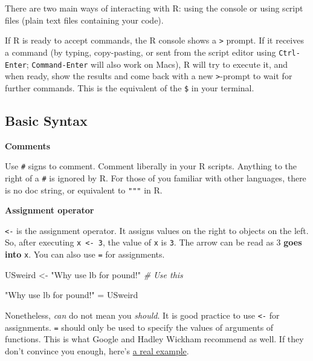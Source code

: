 \documentclass[
]{book}
\newenvironment{Shaded}{\begin{snugshade}}{\end{snugshade}}
\newcommand{\CommentTok}[1]{\textcolor[rgb]{0.56,0.35,0.01}{\textit{#1}}}
\newcommand{\NormalTok}[1]{#1}
\newcommand{\OtherTok}[1]{\textcolor[rgb]{0.56,0.35,0.01}{#1}}
\newcommand{\StringTok}[1]{\textcolor[rgb]{0.31,0.60,0.02}{#1}}
\begin{document}
There are two main ways of interacting with R: using the console or using script files (plain text files containing your code).

If R is ready to accept commands, the R console shows a \texttt{\textgreater{}} prompt. If it receives a command (by typing, copy-pasting, or sent from the script editor using \texttt{Ctrl-Enter}; \texttt{Command-Enter} will also work on Macs), R will try to execute it, and when ready, show the results and come back with a new \texttt{\textgreater{}}-prompt to wait for further commands. This is the equivalent of the \texttt{\$} in your terminal.

\hypertarget{basic-syntax}{%
\subsection{Basic Syntax}\label{basic-syntax}}

\textbf{Comments}

Use \texttt{\#} signs to comment. Comment liberally in your R scripts. Anything to the right of a \texttt{\#} is ignored by R. For those of you familiar with other languages, there is no doc string, or equivalent to \texttt{"""} in R.

\textbf{Assignment operator}

\texttt{\textless{}-} is the assignment operator. It assigns values on the right to objects on the left. So, after executing \texttt{x\ \textless{}-\ 3}, the value of \texttt{x} is \texttt{3}. The arrow can be read as 3 \textbf{goes into} \texttt{x}. You can also use \texttt{=} for assignments.

\begin{Shaded}
\begin{Highlighting}[]
\NormalTok{USweird }\OtherTok{\textless{}{-}} \StringTok{"Why use lb for pound!"} \CommentTok{\# Use this}

\StringTok{"Why use lb for pound!"} \OtherTok{=}\NormalTok{ USweird}
\end{Highlighting}
\end{Shaded}

Nonetheless, \emph{can} do not mean you \emph{should}. It is good practice to use \texttt{\textless{}-} for assignments. \texttt{=} should only be used to specify the values of arguments of functions. This is what Google and Hadley Wickham recommend as well. If they don't convince you enough, here's \href{https://csgillespie.wordpress.com/2010/11/16/assignment-operators-in-r-vs/}{a real example}.
\end{document}
